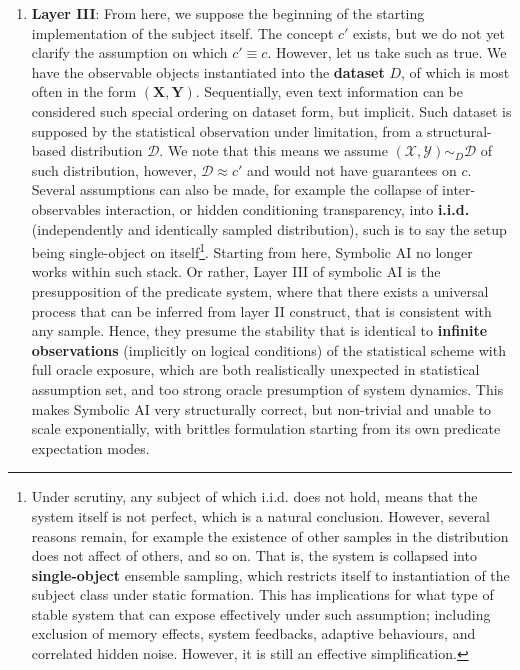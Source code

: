 \begin{enumerate}
    \item \textbf{Layer III}: From here, we suppose the beginning of the starting implementation of the subject itself. The concept $c'$ exists, but we do not yet clarify the assumption on which $c'\equiv c$. However, let us take such as true. We have the observable objects instantiated into the \textbf{dataset} $D$, of which is most often in the form $(\mathbf{X},\mathbf{Y})$. Sequentially, even text information can be considered such special ordering on dataset form, but implicit. Such dataset is supposed by the statistical observation under limitation, from a structural-based distribution $\mathcal{D}$. We note that this means we assume $(\mathcal{X},\mathcal{Y})\sim_{D} \mathcal{D}$ of such distribution, however, $\mathcal{D}\approx c'$ and would not have guarantees on $c$. Several assumptions can also be made, for example the collapse of inter-observables interaction, or hidden conditioning transparency, into \textbf{i.i.d.} (independently and identically sampled distribution), such is to say the setup being single-object on itself\footnote{Under scrutiny, any subject of which i.i.d. does not hold, means that the system itself is not perfect, which is a natural conclusion. However, several reasons remain, for example the existence of other samples in the distribution does not affect of others, and so on. That is, the system is collapsed into \textbf{single-object} ensemble sampling, which restricts itself to instantiation of the subject class under static formation. This has implications for what type of stable system that can expose effectively under such assumption; including exclusion of memory effects, system feedbacks, adaptive behaviours, and correlated hidden noise. However, it is still an effective simplification.}. Starting from here, Symbolic AI no longer works within such stack. Or rather, Layer III of symbolic AI is the presupposition of the predicate system, where that there exists a universal process that can be inferred from layer II construct, that is consistent with any sample. Hence, they presume the stability that is identical to \textbf{infinite observations} (implicitly on logical conditions) of the statistical scheme with full oracle exposure, which are both realistically unexpected in statistical assumption set, and too strong oracle presumption of system dynamics. This makes Symbolic AI very structurally correct, but non-trivial and unable to scale exponentially, with brittles formulation starting from its own predicate expectation modes. 
\end{enumerate}


